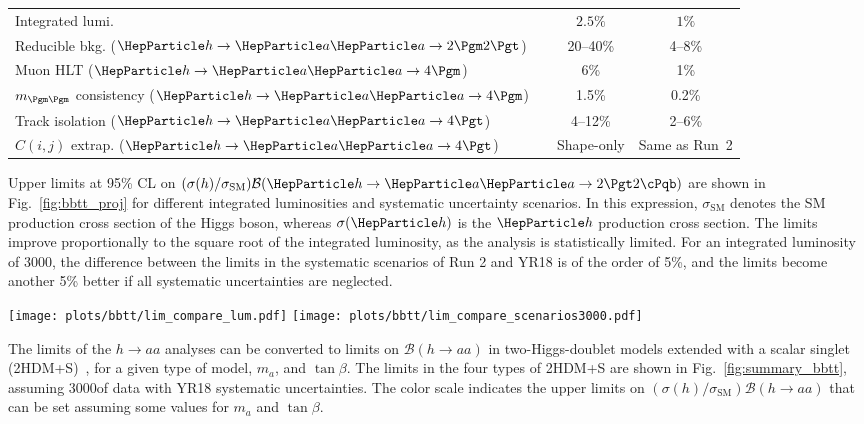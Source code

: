 \begin{table}[hbtp]
\begin{tabular}{@{} l p{3cm} c c @{}}
Integrated lumi.    &         & $2.5\%$                         & $1\%$          \\
Reducible bkg. ($\Ph\to\Pa\Pa\to2\Pgm2\Pgt$) & & 20--40\% & 4--8\% \\
Muon HLT ($\Ph\to\Pa\Pa\to4\Pgm$) & & 6\% & 1\% \\
$m_{\Pgm\Pgm}$ consistency ($\Ph\to\Pa\Pa\to4\Pgm$) & & 1.5\% & 0.2\% \\
Track isolation ($\Ph\to\Pa\Pa\to4\Pgt$) & & 4--12\% & 2--6\% \\
$C(i,j)$ extrap. ($\Ph\to\Pa\Pa\to4\Pgt$) & & Shape-only & Same as Run~2 \\
\end{tabular}
\label{tab:floors}
\vspace{0.5cm}
\label{tab:systematics}
\end{table}


Upper limits at 95\% CL on $(\sigma(h)/\sigma_{\textrm{SM}}) \mathcal{B}(\processbbtt)$ are shown in Fig.~\ref{fig:bbtt_proj} for different integrated luminosities and systematic uncertainty scenarios. In this expression, $\sigma_\textrm{SM}$ denotes the SM production cross section of the Higgs boson, whereas $\sigma(\Ph)$ is the $\Ph$ production cross section.
The limits improve proportionally to the square root of the integrated luminosity,
as the analysis is statistically limited. For an integrated luminosity of 3000\fbinv, the difference between the limits in the  systematic scenarios of Run 2 and YR18 is of the order of 5\%, and the limits become another 5\% better if all systematic uncertainties are neglected.

\begin{figure*}[hbpt]
\centering
        \texttt{[image: plots/bbtt/lim\_compare\_lum.pdf]}
        \texttt{[image: plots/bbtt/lim\_compare\_scenarios3000.pdf]}\\
    \caption{Left: Projected expected limits on $(\sigma(h)/\sigma_{\textrm{SM}})$ times the branching fraction for $h\to aa\to 2b 2\tau$, for 36, 300, and 3000\fbinv. Right: Projected expected limits $(\sigma(h)/\sigma_{\textrm{SM}}) \mathcal{B}(h\to aa \to 2b2\tau)$, comparing different scenarios for systematic uncertainties for an integrated luminosity of 3000\fbinv.}
    \label{fig:bbtt_proj}
\end{figure*}

The limits of the $h\to aa$ analyses can be converted to limits on $\mathcal{B}(h\to aa)$
in two-Higgs-doublet models extended with
a scalar singlet (2HDM+S)~\cite{PhysRevD.90.075004}, for a given type of model, $m_a$, and $\tan\beta$. The limits in the four types of 2HDM+S are shown
in Fig.~\ref{fig:summary_bbtt}, assuming 3000\fbinv of data with YR18 systematic uncertainties. The color scale
indicates the upper limits on $(\sigma(h)/\sigma_{\textrm{SM}}) \mathcal{B}(h\to aa)$ that can be set assuming some values for $m_a$ and $\tan\beta$.

